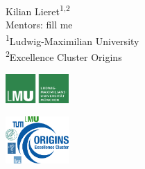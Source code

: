 \begin{frame}{}
	\begin{center}
		{
			{
				\Large \inserttitle
			}\\[0.7ex]
			{
				\large \insertsubtitle
			}
		}\\[2ex]
	   Kilian Lieret\textsuperscript{1,2}\\[2ex]
	   Mentors:
	   {fill me}
	   \\[2.5 ex]
		{
			\footnotesize
			\textsuperscript{1}Ludwig-Maximilian University\\[0ex]
			\vspace{-1ex}\textsuperscript{2}Excellence Cluster Origins
		}\\[2.5ex]
		
		\insertdate
	\end{center}
	\vspace{6ex}
	\centering
	\newcommand\tmp{2.6cm}
	\newcommand\tmpp{2.4cm}
	\begin{changemargin}{-1cm}{-1cm}
	\centering
	{
		\begin{minipage}{\tmp}
		\includegraphics[width=\tmpp]{figures/logos/lmu_logo.pdf}
		\end{minipage}
	}
	{
		\begin{minipage}{\tmp}
			\includegraphics[width=\tmpp]{figures/logos/cluster.pdf}

\end{minipage}}
\end{changemargin}
\end{frame}

